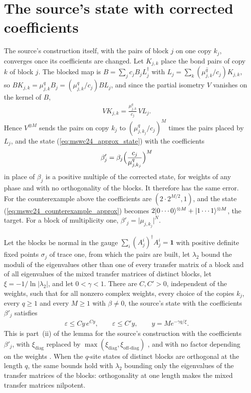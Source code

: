 \documentclass{article}
\begin{document}
\section{The source's state with corrected coefficients}
The source's construction itself, with the pairs of block $j$ on one copy $k_j$, converges
once its coefficients are changed. Let $K_{j,k}$ place the bond pairs of copy $k$ of block
$j$. The blocked map is $B=\sum_jc_jB_jL_j^\dagger$ with
$L_j=\sum_k(\overline{\mu_{j,k}^q}/c_j)K_{j,k}$, so
$BK_{j,k}=\mu_{j,k}^qB_j=(\mu_{j,k}^q/c_j)BL_j$, and since the partial isometry $V$
vanishes on the kernel of $B$,
\begin{align*}
    VK_{j,k}=\frac{\mu_{j,k}^q}{c_j}\,VL_j .
\end{align*}
Hence $V^{\otimes M}$ sends the pairs on copy $k_j$ to $(\mu_{j,k_j}^q/c_j)^M$ times the
pairs placed by $L_j$, and the state (\ref{eq:mswc24_approx_state}) with the coefficients
\begin{align*}
    \beta'_j=\beta_j\Bigl(\frac{c_j}{\mu_{j,k_j}^q}\Bigr)^M
\end{align*}
in place of $\beta_j$ is a positive multiple of the corrected state, for weights of any
phase and with no orthogonality of the blocks. It therefore has the same error. For the
counterexample above the coefficients are $(2\cdot2^{M/2},1)$, and the state
(\ref{eq:mswc24_counterexample_approx}) becomes
$2|0\cdots0\rangle^{\otimes M}+|1\cdots1\rangle^{\otimes M}$, the target. For a block of
multiplicity one, $\beta'_j=\lvert\mu_{j,k_j}\rvert^N$.

Let the blocks be normal in the gauge $\sum_i(A_j^i)^\dagger A_j^i=\mathbf 1$ with positive
definite fixed points $\sigma_j$ of trace one, from which the pairs are built, let
$\lambda_2$ bound the moduli of the eigenvalues other than one of every transfer matrix of a
block and of all eigenvalues of the mixed transfer matrices of distinct blocks, let
$\xi=-1/\ln\lvert\lambda_2\rvert$, and let $0<\gamma<1$. There are $C,C'>0$, independent
of the weights, such that for all nonzero complex weights, every choice of the copies $k_j$,
every $q\geq1$ and every $M\geq1$ with $\beta\neq0$, the source's state with the
coefficients $\beta'_j$ satisfies
\begin{align*}
    \varepsilon\leq Cy\,e^{Cy},\qquad\varepsilon\leq C'y,\qquad y=Me^{-\gamma q/\xi}.
\end{align*}
This is part~(ii) of the lemma for the source's construction with the coefficients
$\beta'_j$, with $\xi_{\mathrm{diag}}$ replaced by
$\max(\xi_{\mathrm{diag}},\xi_{\mathrm{off\text{-}diag}})$
\cite{gap:mswc24_block_form_mixed_overlap}, and with no factor depending on the weights
\cite{gap:mswc24_repeated_overlap_small_weight_sum}. When the $q$-site states of distinct
blocks are orthogonal at the length $q$, the same bounds hold with $\lambda_2$ bounding only
the eigenvalues of the transfer matrices of the blocks: orthogonality at one length makes the
mixed transfer matrices nilpotent.
\end{document}
